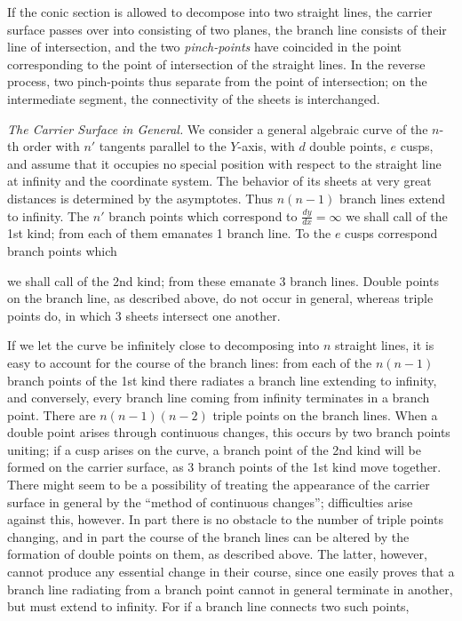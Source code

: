 \documentclass{article}
\begin{document}
If the conic section is allowed to decompose into two straight lines, the carrier surface passes over into consisting of two planes, the branch line consists of their line of intersection, and the two \emph{pinch-points} have coincided in the point corresponding to the point of intersection of the straight lines. In the reverse process, two pinch-points thus separate from the point of intersection; on the intermediate segment, the connectivity of the sheets is interchanged.

\emph{The Carrier Surface in General.} We consider a general algebraic curve of the $n$-th order with $n'$ tangents parallel to the $Y$-axis, with $d$ double points, $e$ cusps, and assume that it occupies no special position with respect to the straight line at infinity and the coordinate system. The behavior of its sheets at very great distances is determined by the asymptotes. Thus $n(n - 1)$ branch lines extend to infinity. The $n'$ branch points which correspond to $\frac{dy}{dx} = \infty$ we shall call of the 1st kind; from each of them emanates 1 branch line. To the $e$ cusps correspond branch points which

we shall call of the 2nd kind; from these emanate 3 branch lines. Double points on the branch line, as described above, do not occur in general, whereas triple points do, in which 3 sheets intersect one another.

If we let the curve be infinitely close to decomposing into $n$ straight lines, it is easy to account for the course of the branch lines: from each of the $n(n - 1)$ branch points of the 1st kind there radiates a branch line extending to infinity, and conversely, every branch line coming from infinity terminates in a branch point. There are $n(n - 1)(n - 2)$ triple points on the branch lines. When a double point arises through continuous changes, this occurs by two branch points uniting; if a cusp arises on the curve, a branch point of the 2nd kind will be formed on the carrier surface, as 3 branch points of the 1st kind move together. There might seem to be a possibility of treating the appearance of the carrier surface in general by the “method of continuous changes”; difficulties arise against this, however. In part there is no obstacle to the number of triple points changing, and in part the course of the branch lines can be altered by the formation of double points on them, as described above. The latter, however, cannot produce any essential change in their course, since one easily proves that a branch line radiating from a branch point cannot in general terminate in another, but must extend to infinity. For if a branch line connects two such points,
\end{document}
